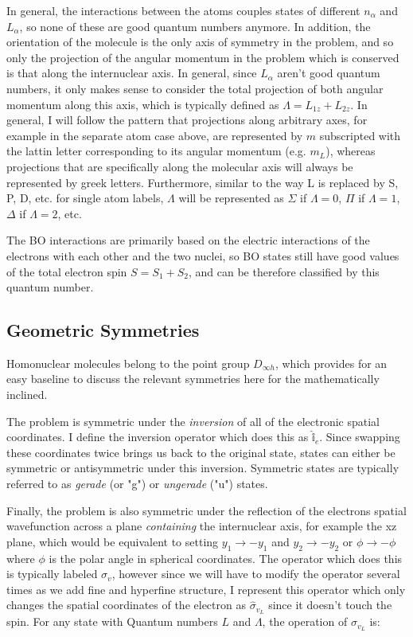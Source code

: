 \documentclass[prl, longbibliography]{revtex4-2}
\begin{document}
In general, the interactions between the atoms couples states of different $n_\alpha$ and $L_\alpha$, so none of these are good quantum numbers anymore. In addition, the orientation of the molecule is the only axis of symmetry in the problem, and so only the projection of the angular momentum in the problem which is conserved is that along the internuclear axis. 
In general, since $L_\alpha$ aren't good quantum numbers, it only makes sense to consider the total projection of both angular momentum along this axis, which is typically defined as $\Lambda=L_{1z}+L_{2z}$. 
In general, I will follow the pattern that projections along arbitrary axes, for example in the separate atom case above, are represented by $m$ subscripted with the lattin letter corresponding to its angular momentum (e.g. $m_L$), whereas projections that are specifically along the molecular axis will always be represented by greek letters.
Furthermore, similar to the way L is replaced by S, P, D, etc. for single atom labels, $\Lambda$ will be represented as $\Sigma$ if $\Lambda=0$, $\Pi$ if $\Lambda=1$, $\Delta$ if $\Lambda=2$, etc.

The BO interactions are primarily based on the electric interactions of the electrons with each other and the two nuclei, so BO states still have good values of the total electron spin $S=S_1+S_2$, and can be therefore classified by this quantum number.



\subsection{Geometric Symmetries}

Homonuclear molecules belong to the point group $D_{\infty h}$, which provides for an easy baseline to discuss the relevant symmetries here for the mathematically inclined. 

The problem is symmetric under the \emph{inversion} of all of the electronic spatial coordinates. 
I define the inversion operator which does this as $\hat{\mathbb{i}}_e$.
Since swapping these coordinates twice brings us back to the original state, states can either be symmetric or antisymmetric under this inversion. 
Symmetric states are typically referred to as \emph{gerade} (or "g") or \emph{ungerade} ("u") states. 

Finally, the problem is also symmetric under the reflection of the electrons spatial wavefunction across a plane \emph{containing} the internuclear axis, for example the xz plane, which would be equivalent to setting $y_1\rightarrow -y_1$ and $y_2\rightarrow-y_2$ or $\phi\rightarrow -\phi$ where $\phi$ is the polar angle in spherical coordinates.
The operator which does this is typically labeled $\sigma_v$, however since we will have to modify the operator several times as we add fine and hyperfine structure, I represent this operator which only changes the spatial coordinates of the electron as $\hat{\sigma}_{v_L}$ since it doesn't touch the spin. For any state with Quantum numbers $L$ and $\Lambda$, the operation of $\sigma_{v_L}$ is:
\end{document}
